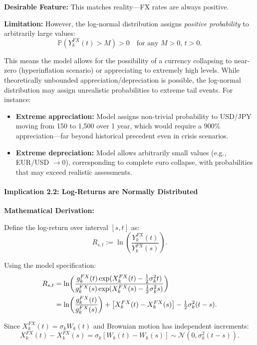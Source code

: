 \textbf{Desirable Feature:} This matches reality—FX rates are always positive.

\textbf{Limitation:} However, the log-normal distribution assigns \textit{positive probability} to arbitrarily large values:
\begin{equation}
	\mathbb{P}(Y_k^{FX}(t) > M) > 0 \quad \text{for any } M > 0, \, t > 0.
\end{equation}

This means the model allows for the possibility of a currency collapsing to near-zero (hyperinflation scenario) or appreciating to extremely high levels. While theoretically unbounded appreciation/depreciation is possible, the log-normal distribution may assign unrealistic probabilities to extreme tail events. For instance:
\begin{itemize}
	\item \textbf{Extreme appreciation:} Model assigns non-trivial probability to USD/JPY moving from 150 to 1,500 over 1 year, which would require a 900\% appreciation—far beyond historical precedent even in crisis scenarios.
	\item \textbf{Extreme depreciation:} Model allows arbitrarily small values (e.g., EUR/USD $\to 0$), corresponding to complete euro collapse, with probabilities that may exceed realistic assessments.
\end{itemize}

\paragraph{Implication 2.2: Log-Returns are Normally Distributed}

\textbf{Mathematical Derivation:}

Define the log-return over interval $[s,t]$ as:
\begin{equation}
	R_{s,t} := \ln\!\left(\frac{Y_k^{FX}(t)}{Y_k^{FX}(s)}\right).
\end{equation}

Using the model specification:
\begin{align}
	R_{s,t} &= \ln\!\left(\frac{g_k^{FX}(t) \exp(X_k^{FX}(t) - \frac{1}{2}\sigma_k^2 t)}{g_k^{FX}(s) \exp(X_k^{FX}(s) - \frac{1}{2}\sigma_k^2 s)}\right) \notag \\
	&= \ln\!\left(\frac{g_k^{FX}(t)}{g_k^{FX}(s)}\right) + \left[X_k^{FX}(t) - X_k^{FX}(s)\right] - \tfrac{1}{2}\sigma_k^2(t-s).
\end{align}

Since $X_k^{FX}(t) = \sigma_k W_k(t)$ and Brownian motion has independent increments:
\begin{equation}
	X_k^{FX}(t) - X_k^{FX}(s) = \sigma_k[W_k(t) - W_k(s)] \sim \mathcal{N}(0, \sigma_k^2(t-s)).
\end{equation}

